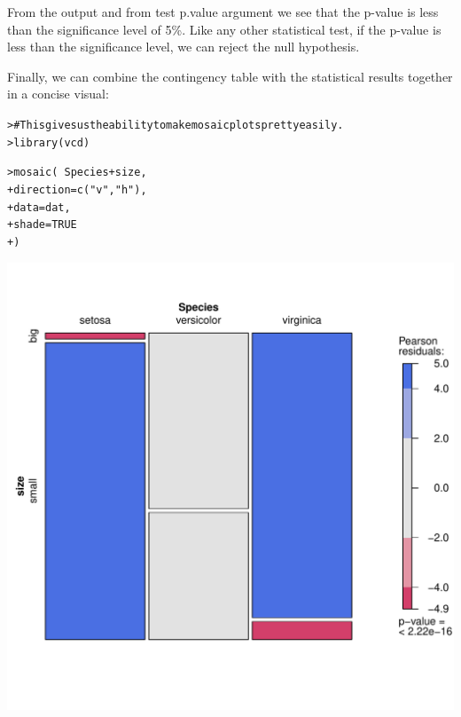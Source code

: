 \documentclass[12pt]{article}\usepackage[]{graphicx}\usepackage[]{color}
\makeatletter
\def\maxwidth{ %
  \ifdim\Gin@nat@width>\linewidth
    \linewidth
  \else
    \Gin@nat@width
  \fi
}
\newcommand{\hlnum}[1]{\textcolor[rgb]{0.82,0.78,0.62}{#1}}%
\newcommand{\hlstr}[1]{\textcolor[rgb]{0.82,0.78,0.62}{#1}}%
\newcommand{\hlcom}[1]{\textcolor[rgb]{0.404,0.408,0.42}{#1}}%
\newcommand{\hlopt}[1]{\textcolor[rgb]{0.882,0.878,0.898}{#1}}%
\newcommand{\hlstd}[1]{\textcolor[rgb]{0.882,0.878,0.898}{#1}}%
\newcommand{\hlkwc}[1]{\textcolor[rgb]{0.812,0.522,0.388}{#1}}%
\newcommand{\hlkwd}[1]{\textcolor[rgb]{0.733,0.388,0.812}{#1}}%
\newenvironment{kframe}{%
 \def\at@end@of@kframe{}%
 \ifinner\ifhmode%
  \def\at@end@of@kframe{\end{minipage}}%
  \begin{minipage}{\columnwidth}%
 \fi\fi%
 \def\FrameCommand##1{\hskip\@totalleftmargin \hskip-\fboxsep
 \colorbox{shadecolor}{##1}\hskip-\fboxsep
     \hskip-\linewidth \hskip-\@totalleftmargin \hskip\columnwidth}%
 \MakeFramed {\advance\hsize-\width
   \@totalleftmargin\z@ \linewidth\hsize
   \@setminipage}}%
 {\par\unskip\endMakeFramed%
 \at@end@of@kframe}
\newenvironment{knitrout}{}{} %
\makeatother
\begin{document}
\begin{flushleft}
From the output and from test p.value argument we see that the p-value is less than the significance level of 5\%. Like any other statistical test, if the p-value is less than the significance level, we can reject the null hypothesis.

Finally, we can combine the contingency table with the statistical results together in a concise visual:

\begin{knitrout}
\color{fgcolor}\begin{kframe}
\begin{alltt}
\hlstd{> }\hlcom{# This gives us the ability to make mosaic plots pretty easily.}
\hlstd{> }\hlkwd{library}\hlstd{(vcd)}
\end{alltt}


{\ttfamily\noindent\color{warningcolor}{\#\# Warning: package 'vcd' was built under R version 4.0.5}}

{\ttfamily\noindent\itshape\color{messagecolor}{\#\# Loading required package: grid}}\begin{alltt}
\hlstd{> }\hlkwd{mosaic}\hlstd{(}\hlopt{~} \hlstd{Species} \hlopt{+} \hlstd{size,}
\hlstd{+ }  \hlkwc{direction} \hlstd{=} \hlkwd{c}\hlstd{(}\hlstr{"v"}\hlstd{,} \hlstr{"h"}\hlstd{),}
\hlstd{+ }  \hlkwc{data} \hlstd{= dat,}
\hlstd{+ }  \hlkwc{shade} \hlstd{=} \hlnum{TRUE}
\hlstd{+ }\hlstd{)}
\end{alltt}
\end{kframe}
\includegraphics[width=\maxwidth]{figure/chisquared3-1} 


\end{knitrout}
\end{flushleft}
\end{document}
